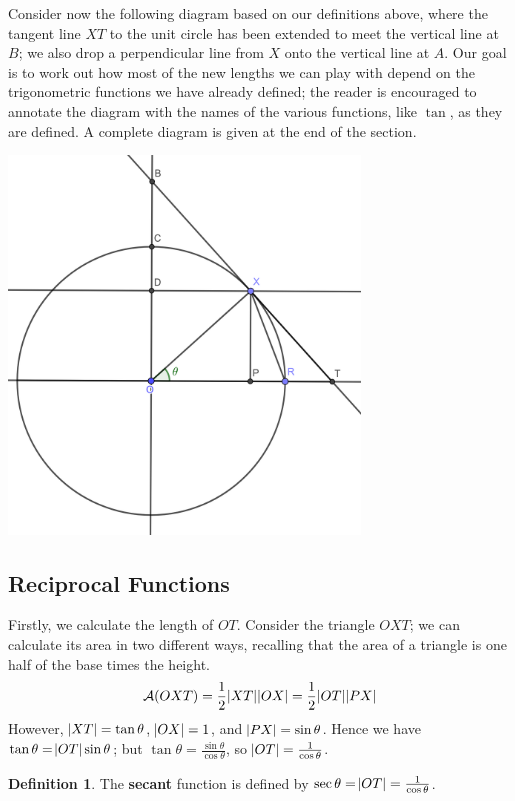 \documentclass[a4paper,leqno]{article}
\numberwithin{equation}{section}
\theoremstyle{definition}
\newtheorem{defn}[equation]{Definition}
\theoremstyle{remark}
\newcommand{\df}[1]{\textbf{#1}}
\begin{document}
Consider now the following diagram based on our definitions above, where the tangent line $ XT $ to the unit circle has been
extended to meet the vertical line at $ B $; we also drop a perpendicular line from $ X $ onto the vertical line at $ A $.
Our goal is to work out how most of the new lengths we can play with depend on the trigonometric functions we have already
defined; the reader is encouraged to annotate the diagram with the names of the various functions, like $ \tan $, as they
are defined. A complete diagram is given at the end of the section.
\begin{center}
  \includegraphics[width=0.7\textwidth]{taxonomy}
\end{center}

\subsection{Reciprocal Functions}
Firstly, we calculate the length of $ OT $. Consider the triangle $ OXT $; we can calculate its area in two different ways,
recalling that the area of a triangle is one half of the base times the height.
\begin{displaymath}
  \mathcal{A}(OXT) = \frac{1}{2}\abs{XT}\abs{OX} = \frac{1}{2}\abs{OT}\abs{PX}
\end{displaymath}
However, $ \abs{XT} = \tan \theta $, $ \abs{OX} = 1 $, and $ \abs{PX} = \sin \theta $. Hence we
have $ \tan \theta = \abs{OT}\sin \theta $; but $ \tan \theta = \frac{\sin \theta}{\cos \theta} $,
so $ \abs{OT} = \frac{1}{\cos \theta} $.
\begin{defn}
  The \df{secant} function is defined by $ \sec \theta = \abs{OT} = \frac{1}{\cos \theta} $.
\end{defn}
\end{document}
